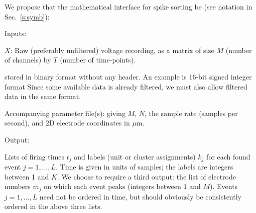 \documentclass[10pt]{article}
\begin{document}
We propose that the mathematical
interface for spike sorting be (see notation in Sec.~\ref{s:symb}):

\vspace{2ex}

\begin{minipage}[t]{1in}Inputs:\end{minipage} \begin{minipage}[t]{5in}
  $X$: Raw (preferably unfiltered)
  voltage recording, as a matrix of size $M$ (number of channels) by
  $T$ (number of time-points).

  
  stored in binary format without any header.
  An example is 16-bit signed integer format
  Since some available data is already filtered, we must also allow
  filtered data in the same format.

  Accompanying parameter file(s): giving $M$, $N$,
  the sample rate (samples per second), and 2D electrode coordinates in $\mu$m.
  \end{minipage}

\begin{minipage}[t]{1in}Output:\end{minipage} \begin{minipage}[t]{5in}
  Lists of firing times $t_j$ and labels (unit or cluster assignments) $k_j$
  for each found event $j=1,\ldots,L$. Time is given in units of samples;
  the labels are integers between 1 and $K$.
  We choose to require a third output: the list of electrode numbers
  $m_j$ on which each event peaks (integers between $1$ and $M$).
  Events $j=1,\ldots,L$ need not be ordered in time, but should obviously
  be consistently ordered in the above three lists.
\end{minipage}

\vspace{2ex}
\end{document}
